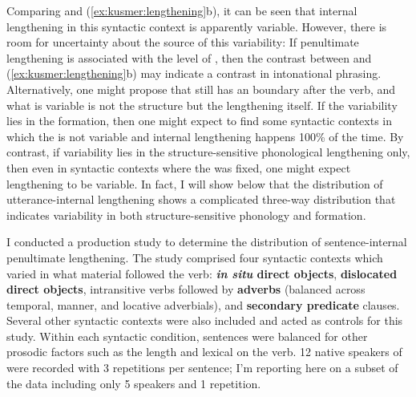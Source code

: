 \documentclass[output=paper 
,modfonts
,nonflat]{langsci/langscibook}
\begin{document}
Comparing  and
(\ref{ex:kusmer:lengthening}b), it can be seen that internal lengthening in
this syntactic context is apparently variable.  However, there is room for
uncertainty about the source of this variability: If penultimate lengthening is
associated with the  level of , then the
contrast between  and (\ref{ex:kusmer:lengthening}b)
may indicate a contrast in intonational phrasing.  Alternatively, one might
propose that  still has an  boundary
after the verb, and what is variable is not the structure but the lengthening
itself. If the variability lies in the  formation, then one
might expect to find some syntactic contexts in which the  is
not variable and internal lengthening happens 100\% of the time. By contrast,
if variability lies in the structure-sensitive phonological lengthening only,
then even in syntactic contexts where the  was fixed, one
might expect lengthening to be variable. In fact, I will show below that the
distribution of utterance-internal lengthening shows a complicated three-way
distribution that indicates variability in both structure-sensitive phonology
and  formation.

I conducted a production study to determine the distribution of
sentence-in\-ter\-nal penultimate lengthening. The study comprised four syntactic
contexts which varied in what material followed the verb: \textbf{\textit{in
situ} direct objects}, \textbf{dislocated direct objects}, intransitive verbs
followed by \textbf{adverbs} (balanced across temporal, manner, and locative
adverbials), and \textbf{secondary predicate} clauses. Several other syntactic
contexts were also included and acted as controls for this study.  Within each
syntactic condition, sentences were balanced for other prosodic factors such as
the length and lexical  on the verb. 12 native speakers of  were
recorded with 3 repetitions per sentence; I'm reporting here on a subset of the
data including only 5 speakers and 1 repetition.

\end{document}
